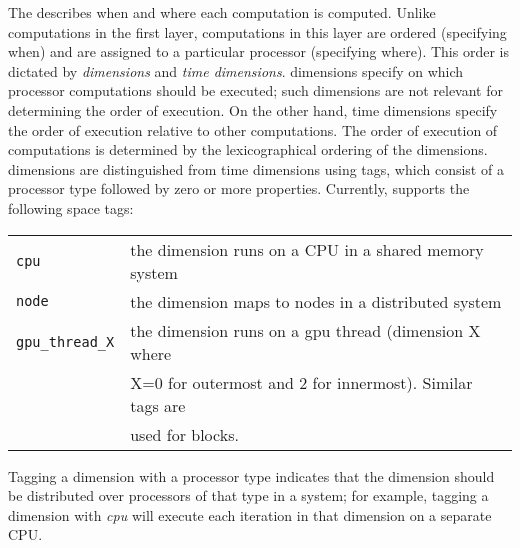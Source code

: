 The \layertwo describes when and where each computation is computed.  Unlike computations in the first layer, computations in this layer are ordered (specifying when) and are assigned to a particular processor (specifying where).  This order is dictated by \textit{\processor dimensions} and \textit{time dimensions}.  \Processor{} dimensions specify on which processor computations should be executed; such dimensions are not relevant for determining the order of execution.  On the other hand,  time dimensions specify the order of execution relative to other computations.  The order of execution of computations is determined by the lexicographical ordering of the dimensions.
\Processor{} dimensions are distinguished from time dimensions using tags, which consist of a processor type followed by
zero or more properties.  Currently, \framework{} supports the following space tags:

{
\centering
{
    \footnotesize
    \setlength\tabcolsep{5pt}
    \begin{tabular}{ll}
        \texttt{cpu} & the dimension runs on a CPU in a shared memory system \\
        \texttt{node} & the dimension maps to nodes in a distributed system \\
        \texttt{gpu\_thread\_X} & the dimension runs on a gpu thread (dimension X where \\
        & X=0 for outermost and 2 for innermost).
        Similar tags are \\
        & used for blocks.\\
    \end{tabular}
}
}

Tagging a dimension with a processor type indicates that the dimension should be distributed over processors of that type in a system; for example, tagging a dimension with \emph{cpu} will execute each iteration in that dimension on a separate CPU.

